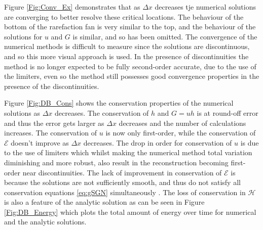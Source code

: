 \documentclass[10pt]{elsarticle}
\begin{document}
%
Figure \ref{Fig:Conv_Ex} demonstrates that as $\Delta x$ decreases tje numerical solutions are converging to better resolve these critical locations. The behaviour of the bottom of the rarefaction fan is very similar to the top, and the behaviour of the solutions for $u$ and $G$ is similar, and so has been omitted. The convergence of the numerical methods is difficult to measure since the solutions are discontinuous, and so this more visual approach is used. In the presence of discontinuities the method is no longer expected to be fully second-order accurate, due to the use of the limiters, even so the method still possesses good convergence properties in the presence of the discontinuities.

Figure \ref{Fig:DB_Cons} shows the conservation properties of the numerical solutions as $\Delta x$ decreases. The conservation of $h$ and $G=uh$ is at round-off error and thus the error gets larger as $\Delta x$ decreases and the number of calculations increases. The conservation of $u$ is now only first-order, while the conservation of $\mathcal{E}$ doesn't improve as $\Delta x$ decreases. The drop in order for conservation of $u$ is due to the use of limiters which whilst making the numerical method total variation diminishing \cite{LeVeque-2002} and more robust, also result in the reconstruction becoming first-order near discontinuities. The lack of improvement in conservation of $\mathcal{E}$ is because the solutions are not sufficiently smooth, and thus do not satisfy all conservation equations \eqref{eq:gSGN} simultaneously \cite{Pu-2018-1361}. The loss of conservation in $\mathcal{H}$ is also a feature of the analytic solution as can be seen in Figure \ref{Fig:DB_Energy} which plots the total amount of energy over time for numerical and the analytic solutions. 
%
\end{document}
